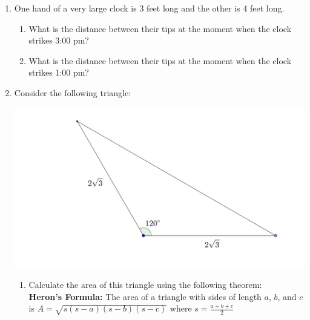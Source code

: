 \documentclass[12pt]{article}
\newif\ifans
\begin{document}
\begin{enumerate}
\ifans\fbox{$\frac{3}{8}-\frac{1}{2}\cos2\theta+\frac{1}{8}\cos4\theta$} \fi

\item One hand of a very large clock is 3 feet long and the other is 4 feet long.

\begin{enumerate}

\item What is the distance between their tips at the moment when the clock strikes 3:00 pm?

\ifans\fbox{5 feet} \fi

\item What is the distance between their tips at the moment when the clock strikes 1:00 pm?

\ifans\fbox{$\sqrt{25-12\sqrt{3}}$ feet} \fi

\end{enumerate}

\item Consider the following triangle:

\begin{center}
\includegraphics[scale=0.15]{heron.pdf}
\end{center}

\begin{enumerate}

\item Calculate the area of this triangle using the following theorem:\\

{\bf Heron's Formula:} The area of a triangle with sides of length $a$, $b$, and $c$ is $A=\sqrt{s(s-a)(s-b)(s-c)}$ where $s=\frac{a+b+c}{2}$

\ifans\fbox{\parbox{1\linewidth}{Using the Law of Cosines, the missing side of the triangle has length 6.  So, it follows that $a=2\sqrt{3}$, $b=2\sqrt{3}$, $c=6$, and $s=2\sqrt{3}+3$.  Appealing to Heron's Formula gives:
\begin{align*}
A&=\sqrt{s(s-a)(s-b)(s-c)}\\
&=\sqrt{\left(2\sqrt{3}+3\right)\left(2\sqrt{3}+3-2\sqrt{3}\right)\left(2\sqrt{3}+3-2\sqrt{3}\right)\left(2\sqrt{3}+3-6\right)}\\
&=\sqrt{\left(2\sqrt{3}+3\right)(3)(3)\left(2\sqrt{3}-3\right)}\\
&=3\sqrt{\left(2\sqrt{3}+3\right)\left(2\sqrt{3}-3\right)}\\
&=3\sqrt{3}
\end{align*}
}} \fi


\end{enumerate}
\end{enumerate}
\end{document}
